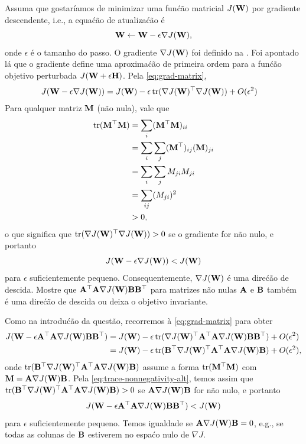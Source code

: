 \label{ex:descent-directions-for-matrix-valued-functions}
Assuma que gostar\'iamos de minimizar uma fun\'c\~ao matricial $J(\mathbf{W})$ por gradiente
descendente, i.e., a equa\'c\~ao de atualiza\'c\~ao \'e
\begin{equation}
    \mathbf{W} \leftarrow \mathbf{W} - \epsilon \nabla J(\mathbf{W}),
\end{equation}
onde $\epsilon$ \'e o tamanho do passo. O gradiente $\nabla J(\mathbf{W})$ foi definido na
. Foi apontado l\'a que o gradiente define uma
aproxima\'c\~ao de primeira ordem para a fun\'c\~ao objetivo perturbada $J(\mathbf{W}+\epsilon
\mathbf{H})$. Pela \eqref{eq:grad-matrix},
\begin{align}
    J(\mathbf{W} - \epsilon \nabla J(\mathbf{W})) & = J(\mathbf{W}) - \epsilon \operatorname{tr}(\nabla J(\mathbf{W})^\top \nabla J(\mathbf{W})) + O(\epsilon^2)
\end{align}
Para qualquer matriz $\mathbf{M}$ (n\~ao nula), vale que
\begin{align}
    \operatorname{tr}(\mathbf{M}^\top \mathbf{M}) &= \sum_{i} (\mathbf{M}^\top\mathbf{M})_{ii}\\
    &= \sum_i \sum_j (\mathbf{M}^\top)_{ij} (\mathbf{M})_{ji}\\
    &= \sum_i \sum_j M_{ji} M_{ji}\\
    &= \sum_{ij} (M_{ji})^2\\
    &> 0, \label{eq:trace-nonnegativity-alt}
\end{align}
o que significa que $\operatorname{tr}(\nabla J(\mathbf{W})^\top \nabla J(\mathbf{W})) > 0$ se o gradiente for n\~ao nulo, e portanto
\begin{equation}
    J(\mathbf{W} - \epsilon \nabla J(\mathbf{W})) < J(\mathbf{W})
\end{equation}
para $\epsilon$ suficientemente pequeno. Consequentemente, $\nabla J(\mathbf{W})$ \'e uma dire\'c\~ao de descida.
Mostre que $\mathbf{A}^\top \mathbf{A} \nabla J(\mathbf{W})\mathbf{B}\mathbf{B}^\top$ para matrizes n\~ao nulas
$\mathbf{A}$ e $\mathbf{B}$ tamb\'em \'e uma dire\'c\~ao de descida ou deixa o objetivo invariante.

\begin{solution}
    Como na introdu\'c\~ao da quest\~ao, recorremos \`a \eqref{eq:grad-matrix} para
    obter
    \begin{align}
        J(\mathbf{W} - \epsilon \mathbf{A}^\top \mathbf{A} \nabla J(\mathbf{W}) \mathbf{B}\mathbf{B}^\top) & = J(\mathbf{W}) - \epsilon \operatorname{tr}(\nabla J(\mathbf{W})^\top \mathbf{A}^\top \mathbf{A} \nabla J(\mathbf{W})\mathbf{B}\mathbf{B}^\top) + O(\epsilon^2)\\
        & =  J(\mathbf{W}) - \epsilon \operatorname{tr}(\mathbf{B}^\top \nabla J(\mathbf{W})^\top \mathbf{A}^\top \mathbf{A} \nabla J(\mathbf{W})\mathbf{B}) + O(\epsilon^2),
    \end{align}
    onde $\operatorname{tr}(\mathbf{B}^\top \nabla J(\mathbf{W})^\top\mathbf{A}^\top \mathbf{A} \nabla J(\mathbf{W})\mathbf{B})$ assume a forma
    $\operatorname{tr}(\mathbf{M}^\top \mathbf{M})$ com $\mathbf{M}= \mathbf{A} \nabla J(\mathbf{W})\mathbf{B}$. Pela
    \eqref{eq:trace-nonnegativity-alt}, temos assim que $\operatorname{tr}(\mathbf{B}^\top \nabla J(\mathbf{W})^\top \mathbf{A}^\top
    \mathbf{A} \nabla J(\mathbf{W})\mathbf{B}) > 0$ se $\mathbf{A} \nabla J(\mathbf{W})\mathbf{B}$ for n\~ao nulo, e portanto
    \begin{equation}
        J(\mathbf{W} - \epsilon \mathbf{A}^\top \mathbf{A} \nabla J(\mathbf{W}) \mathbf{B}\mathbf{B}^\top) < J(\mathbf{W})
    \end{equation}
    para $\epsilon$ suficientemente pequeno. Temos igualdade se $\mathbf{A} \nabla J(\mathbf{W})\mathbf{B} = 0$,
    e.g., se todas as colunas de $\mathbf{B}$ estiverem no espa\'co nulo de $\nabla J$.
\end{solution}